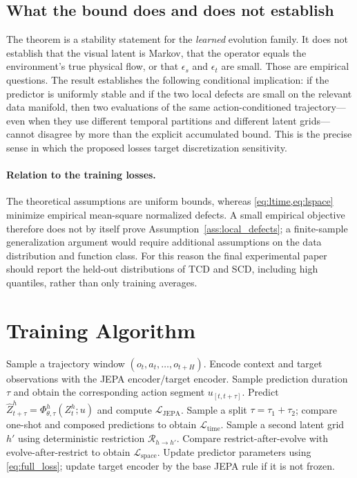 \documentclass{article}
\theoremstyle{plain}
\theoremstyle{definition}
\theoremstyle{remark}
\newcommand{\PhiOp}{\Phi}
\newcommand{\Restr}{\mathcal{R}}
\newcommand{\Loss}{\mathcal{L}}
\newcommand{\POJEPA}{\textsc{PO-JEPA}}
\begin{document}
\subsection{What the bound does and does not establish}
The theorem is a stability statement for the \emph{learned} evolution family. It does not establish that the visual latent is Markov, that the operator equals the environment's true physical flow, or that $\epsilon_s$ and $\epsilon_t$ are small. Those are empirical questions. The result establishes the following conditional implication: if the predictor is uniformly stable and if the two local defects are small on the relevant data manifold, then two evaluations of the same action-conditioned trajectory---even when they use different temporal partitions and different latent grids---cannot disagree by more than the explicit accumulated bound. This is the precise sense in which the proposed losses target discretization sensitivity.

\paragraph{Relation to the training losses.}
The theoretical assumptions are uniform bounds, whereas \cref{eq:ltime,eq:lspace} minimize empirical mean-square normalized defects. A small empirical objective therefore does not by itself prove Assumption~\ref{ass:local_defects}; a finite-sample generalization argument would require additional assumptions on the data distribution and function class. For this reason the final experimental paper should report the held-out distributions of TCD and SCD, including high quantiles, rather than only training averages.

\section{Training Algorithm}
\label{app:algorithm}

\begin{algorithm}[H]
\caption{One training iteration of \POJEPA{}}
\label{alg:po_jepa}
\begin{algorithmic}[1]
\STATE Sample a trajectory window $(o_t,a_t,\ldots,o_{t+H})$.
\STATE Encode context and target observations with the JEPA encoder/target encoder.
\STATE Sample prediction duration $\tau$ and obtain the corresponding action segment $u_{[t,t+\tau]}$.
\STATE Predict $\widehat{Z}_{t+\tau}^{h}=\PhiOp^{h}_{\theta,\tau}(Z_t^h;u)$ and compute $\Loss_{\mathrm{JEPA}}$.
\STATE Sample a split $\tau=\tau_1+\tau_2$; compare one-shot and composed predictions to obtain $\Loss_{\mathrm{time}}$.
\STATE Sample a second latent grid $h'$ using deterministic restriction $\Restr_{h\rightarrow h'}$.
\STATE Compare restrict-after-evolve with evolve-after-restrict to obtain $\Loss_{\mathrm{space}}$.
\STATE Update predictor parameters using \cref{eq:full_loss}; update target encoder by the base JEPA rule if it is not frozen.
\end{algorithmic}
\end{algorithm}
\end{document}

